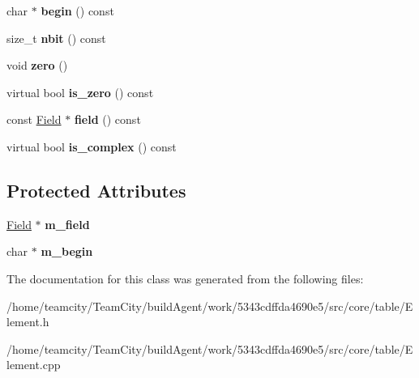 \begin{DoxyCompactItemize}
\item 
char $\ast$ {\bfseries begin} () const \hypertarget{classElement_a63b1dc792df7bf96dd2b466989499d33}{}\label{classElement_a63b1dc792df7bf96dd2b466989499d33}

\item 
size\+\_\+t {\bfseries nbit} () const \hypertarget{classElement_a5c3f292dae7456c38a38c8d2e3c0af7a}{}\label{classElement_a5c3f292dae7456c38a38c8d2e3c0af7a}

\item 
void {\bfseries zero} ()\hypertarget{classElement_ad62f7b8502dc5b6083240fd1fadb00ae}{}\label{classElement_ad62f7b8502dc5b6083240fd1fadb00ae}

\item 
virtual bool {\bfseries is\+\_\+zero} () const \hypertarget{classElement_a5ae575a558cb9d1047a6673cefe4daaa}{}\label{classElement_a5ae575a558cb9d1047a6673cefe4daaa}

\item 
const \hyperlink{classField}{Field} $\ast$ {\bfseries field} () const \hypertarget{classElement_ae9d675372592fc556c8a8ed83b81040b}{}\label{classElement_ae9d675372592fc556c8a8ed83b81040b}

\item 
virtual bool {\bfseries is\+\_\+complex} () const \hypertarget{classElement_a311d28ffc677c6cbb7f5383af8dcccf0}{}\label{classElement_a311d28ffc677c6cbb7f5383af8dcccf0}

\end{DoxyCompactItemize}
\subsection*{Protected Attributes}
\begin{DoxyCompactItemize}
\item 
\hyperlink{classField}{Field} $\ast$ {\bfseries m\+\_\+field}\hypertarget{classElement_a32be443e21537c376e41c61a1f3fe302}{}\label{classElement_a32be443e21537c376e41c61a1f3fe302}

\item 
char $\ast$ {\bfseries m\+\_\+begin}\hypertarget{classElement_a43e5c2622b57e837a71fed98190d970a}{}\label{classElement_a43e5c2622b57e837a71fed98190d970a}

\end{DoxyCompactItemize}


The documentation for this class was generated from the following files\+:\begin{DoxyCompactItemize}
\item 
/home/teamcity/\+Team\+City/build\+Agent/work/5343cdffda4690e5/src/core/table/Element.\+h\item 
/home/teamcity/\+Team\+City/build\+Agent/work/5343cdffda4690e5/src/core/table/Element.\+cpp\end{DoxyCompactItemize}
